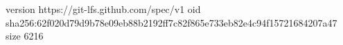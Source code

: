 version https://git-lfs.github.com/spec/v1
oid sha256:62f020d79d9b78e09eb88b2192ff7c82f865e733eb82e4c94f15721684207a47
size 6216

